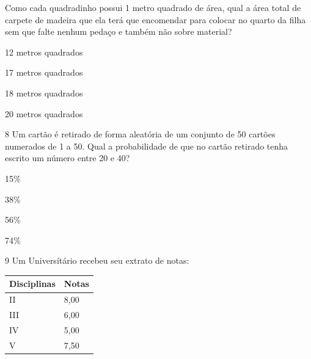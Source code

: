 Como cada quadradinho possui 1 metro quadrado de área, qual a área total
de carpete de madeira que ela terá que encomendar para colocar no quarto
da filha sem que falte nenhum pedaço e também não sobre material?

\begin{escolha}
\item
  12 metros quadrados
\item
  17 metros quadrados
\item
  18 metros quadrados
\item
  20 metros quadrados
\end{escolha}


\num{8} Um cartão é retirado de forma aleatória de um conjunto de 50
cartões numerados de 1 a 50. Qual a probabilidade de que no cartão
retirado tenha escrito um número entre 20 e 40?

\begin{escolha}
\item
  15\%
\item
  38\%
\item
  56\%
\item
  74\%
\end{escolha}


\num{9} Um Universítário recebeu seu extrato de notas:


\begin{longtable}[]{@{}ll@{}}
\toprule
Disciplinas & Notas\tabularnewline
\midrule
\endhead
II & 8,00\tabularnewline
III & 6,00\tabularnewline
IV & 5,00\tabularnewline
V & 7,50\tabularnewline
\bottomrule
\end{longtable}


